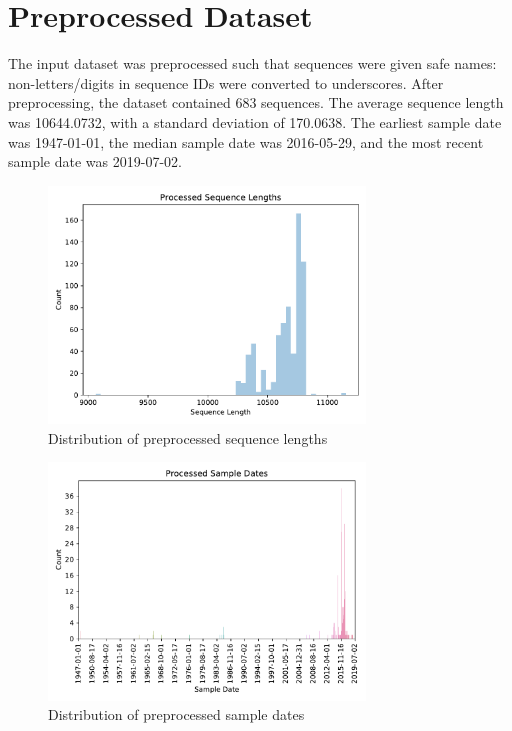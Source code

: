 \documentclass{article}
\begin{document}
\section{Preprocessed Dataset}
The input dataset was preprocessed such that sequences were given safe names: non-letters/digits in sequence IDs were converted to underscores. After preprocessing, the dataset contained 683 sequences. The average sequence length was 10644.0732, with a standard deviation of 170.0638. The earliest sample date was 1947-01-01, the median sample date was 2016-05-29, and the most recent sample date was 2019-07-02.

\begin{figure}[h]
\centering
\includegraphics[width=0.75\textwidth,keepaspectratio]{./figs/processed_sequence_lengths.pdf}
\caption{Distribution of preprocessed sequence lengths}
\end{figure}



\begin{figure}[h]
\centering
\includegraphics[width=0.75\textwidth,keepaspectratio]{./figs/processed_sample_dates.pdf}
\caption{Distribution of preprocessed sample dates}
\end{figure}
\end{document}
